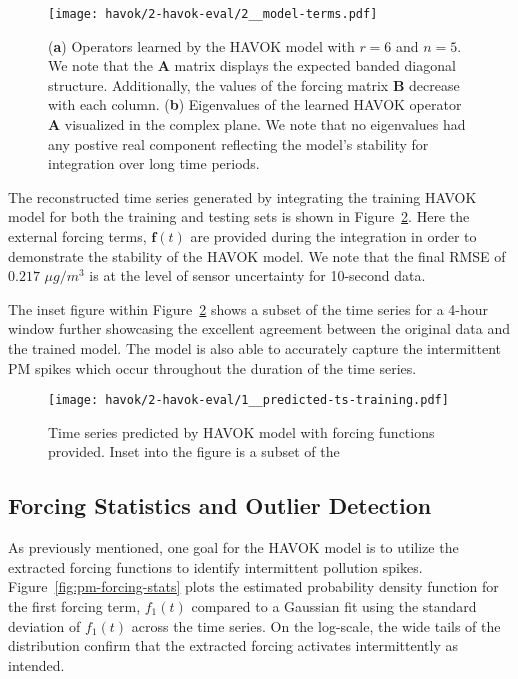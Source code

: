 \begin{figure}[h]
  \vspace{-2cm}
  \centering
  \texttt{[image: havok/2-havok-eval/2\_\_model-terms.pdf]}
  \caption{(\textbf{a}) Operators learned by the HAVOK model with $r=6$ and
    $n=5$. We note that the $\mathbf{A}$ matrix displays the expected banded
    diagonal  structure. Additionally, the values of the forcing matrix
    $\mathbf{B}$ decrease with each column. (\textbf{b}) Eigenvalues of the
    learned HAVOK operator $\mathbf{A}$ visualized in the complex plane. We note
    that no eigenvalues had any postive real component reflecting the model's
    stability for integration over long time periods.}
  \label{fig:pm-havok-operators}
\end{figure}

The reconstructed time series generated by integrating the training HAVOK model
for both the training and testing sets is shown in
Figure~\ref{fig:pm-havok-predictions}. Here the external forcing terms,
$\mathbf{f}(t)$ are provided during the integration in order to demonstrate the
stability of the HAVOK model. We note that the final RMSE of $0.217$ $\mu g/m^3$
is at the level of sensor uncertainty for 10-second data.

The inset figure within Figure~\ref{fig:pm-havok-predictions} shows a subset of
the time series for a 4-hour window further showcasing the excellent agreement
between the original data and the trained model. The model is also able to
accurately capture the intermittent PM spikes which occur throughout the
duration of the time series.

\begin{figure}[h]
  \centering
  \texttt{[image: havok/2-havok-eval/1\_\_predicted-ts-training.pdf]}
  \caption{Time series predicted by HAVOK model with forcing functions provided.
  Inset into the figure is a subset of the }
  \label{fig:pm-havok-predictions}
\end{figure}


\subsection{Forcing Statistics and Outlier Detection}

As previously mentioned, one goal for the HAVOK model is to utilize the
extracted forcing functions to identify intermittent pollution spikes.
Figure~\ref{fig:pm-forcing-stats} plots the estimated probability density
function for the first forcing term, $f_1(t)$ compared to a Gaussian fit using
the standard deviation of $f_1(t)$ across the time series. On the log-scale, the
wide tails of the distribution confirm that the extracted forcing activates
intermittently as intended.

